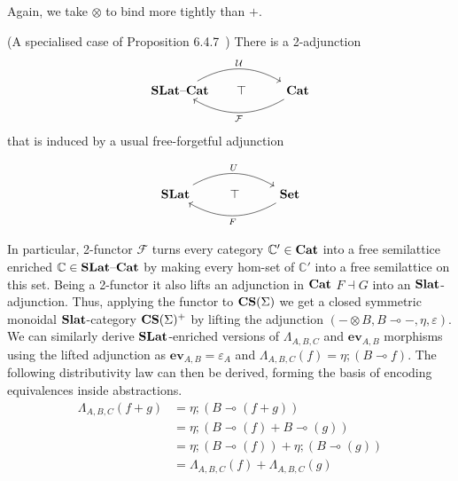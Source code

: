    Again, we take $\otimes$ to bind more tightly than $+$.
    
    \begin{proposition}(A specialised case of Proposition 6.4.7~\cite{Borceux_1994})
    There is a 2-adjunction 
    \[\begin{tikzcd}
        \catname{SLat}\text{--}\catname{Cat}\arrow[rr, "\mathcal{U}", bend left] & \hspace{-1em}\top & \catname{Cat} \arrow[ll, "\mathcal{F}", bend left]
        \end{tikzcd}
    \]
    that is induced by a usual free-forgetful adjunction 
    
    \[\begin{tikzcd}
        \catname{SLat} \arrow[rr, "U", bend left] & \top & \catname{Set} \arrow[ll, "F", bend left]
        \end{tikzcd}
    \]
    \end{proposition}
    
In particular, 2-functor $\mathcal{F}$ turns every category $\mathbb{C'} \in \mathbf{Cat}$ into a free semilattice enriched $\mathbb{C} \in \mathbf{SLat}\text{--}\mathbf{Cat}$ by making every hom-set of $\mathbb{C'}$ into a free semilattice on this set.
Being a 2-functor it also lifts an adjunction in $\mathbf{Cat}$ $F \dashv G$ into an $\mathbf{Slat}$-adjunction.
Thus, applying the functor to $\mathbf{CS}(\Sigma)$ we get a closed symmetric monoidal $\mathbf{Slat}$-category $\mathbf{CS}(\Sigma)^{+}$ by lifting the adjunction $(- \otimes B, B \multimap{} -, \eta, \varepsilon)$.
We can similarly derive $\mathbf{SLat}$-enriched versions of  $\Lambda_{A,B,C}$ and $\textbf{ev}_{A,B}$ morphisms using the lifted adjunction as $\textbf{ev}_{A,B} = \varepsilon_{A}$ and $\Lambda_{A,B,C}(f) = \eta; (B \multimap{} f)$.
The following distributivity law can then be derived, forming the basis of encoding equivalences inside abstractions.
\begin{align*}
\Lambda_{A,B,C}(f + g) &= \eta;(B \multimap (f + g))\\
                       &= \eta;(B \multimap (f) + B \multimap (g))\\
                       &= \eta;(B \multimap (f)) + \eta;(B \multimap (g))\\
                       &= \Lambda_{A,B,C}(f) + \Lambda_{A,B,C}(g)
\end{align*}

